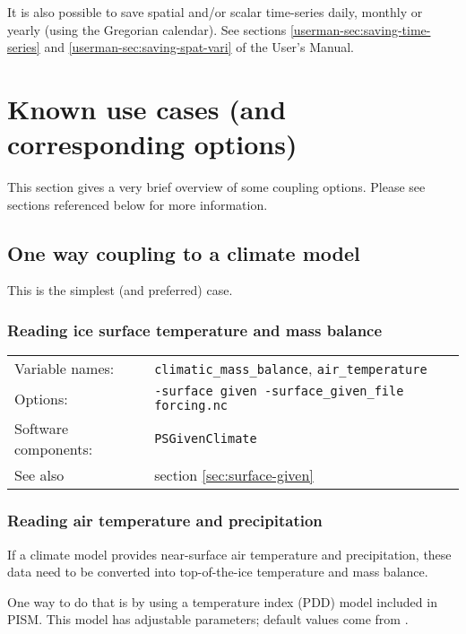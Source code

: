 \documentclass[titlepage,letterpaper,final]{scrartcl}
\def\variable#1{\texttt{#1}\index{NetCDF variables!\texttt{#1}}}
\begin{document}
It is also possible to save spatial and/or scalar time-series daily, monthly or
yearly (using the Gregorian calendar). See sections \ref*{userman-sec:saving-time-series}
and \ref*{userman-sec:saving-spat-vari} of the User's Manual.

\section{Known use cases (and corresponding options)}
\label{sec:known-use-cases}

This section gives a very brief overview of some coupling options. Please see sections referenced below for more information.

\subsection{One way coupling to a climate model}
\label{sec:one-way-coupling}
This is the simplest (and preferred) case.

\subsubsection{Reading ice surface temperature and mass balance}
\label{sec:ice-surface-bc}
\begin{center}
  \begin{tabular}{lp{}}
    \toprule
    Variable names: & \variable{climatic_mass_balance}, \variable{air_temperature} \\
    Options: & \texttt{-surface given -surface_given_file forcing.nc} \\
    Software components: & \texttt{PSGivenClimate} \\
    See also & section \ref{sec:surface-given} \\
    \bottomrule
  \end{tabular}
\end{center}

\subsubsection{Reading air temperature and precipitation}
\label{sec:air-temp-and-precip}

If a climate model provides near-surface air temperature and precipitation, these data need to be converted into top-of-the-ice temperature and mass balance.

One way to do that is by using a temperature index (PDD) model included in PISM. This model has adjustable parameters; default values come from \cite{RitzEISMINT}.
\end{document}
